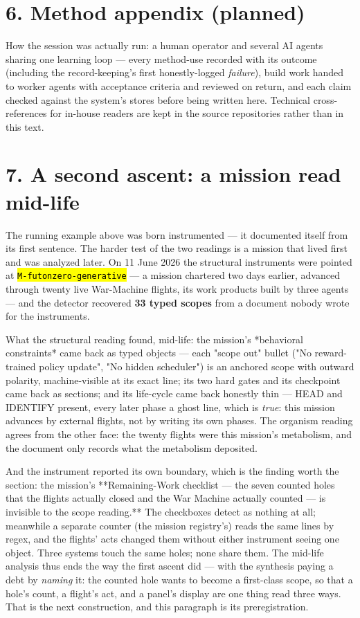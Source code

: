 \documentclass[11pt,oneside]{article}
\newcommand{\scopehl}[1]{\texttt{\hl{#1}}}
\begin{document}
\section*{6. Method appendix (planned)}

How the session was actually run: a human operator and several AI agents
sharing one learning loop --- every method-use recorded with its outcome
(including the record-keeping's first honestly-logged \emph{failure}), build work
handed to worker agents with acceptance criteria and reviewed on return, and
each claim checked against the system's stores before being written here.
Technical cross-references for in-house readers are kept in the source
repositories rather than in this text.

\section*{7. A second ascent: a mission read mid-life}

The running example above was born instrumented --- it documented itself from
its first sentence. The harder test of the two readings is a mission that
lived first and was analyzed later. On 11 June 2026 the structural
instruments were pointed at \scopehl{M-futonzero-generative} --- a mission chartered
two days earlier, advanced through twenty live War-Machine flights, its
work products built by three agents --- and the detector recovered
\textbf{33 typed scopes} from a document nobody wrote for the instruments.

What the structural reading found, mid-life: the mission's *behavioral
constraints* came back as typed objects --- each "scope out" bullet ("No
reward-trained policy update", "No hidden scheduler") is an anchored scope
with outward polarity, machine-visible at its exact line; its two hard
gates and its checkpoint came back as sections; and its life-cycle came
back honestly thin --- HEAD and IDENTIFY present, every later phase a ghost
line, which is \emph{true}: this mission advances by external flights, not by
writing its own phases. The organism reading agrees from the other face:
the twenty flights were this mission's metabolism, and the document only
records what the metabolism deposited.

And the instrument reported its own boundary, which is the finding worth
the section: the mission's **Remaining-Work checklist --- the seven counted
holes that the flights actually closed and the War Machine actually
counted --- is invisible to the scope reading.** The checkboxes detect as
nothing at all; meanwhile a separate counter (the mission registry's)
reads the same lines by regex, and the flights' acts changed them without
either instrument seeing one object. Three systems touch the same holes;
none share them. The mid-life analysis thus ends the way the first ascent
did --- with the synthesis paying a debt by \emph{naming} it: the counted hole
wants to become a first-class scope, so that a hole's count, a flight's
act, and a panel's display are one thing read three ways. That is the
next construction, and this paragraph is its preregistration.
\end{document}
